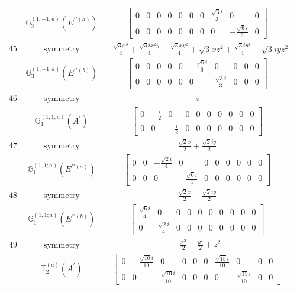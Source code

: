 \documentclass[fleqn,8pt,landscape]{jsarticle}
\begin{document}
\begin{longtable}{ccc}
$  $ & $ \mathbb{G}_{3}^{(1,-1;a)}(E^{\prime\prime(a)}) $ & $ \begin{bmatrix} 0 & 0 & 0 & 0 & 0 & 0 & 0 & \frac{\sqrt{3} i}{3} & 0 & 0 \\ 0 & 0 & 0 & 0 & 0 & 0 & 0 & 0 & - \frac{\sqrt{6} i}{6} & 0 \end{bmatrix} $ \\ \hline
$ 45 $ & $ \text{symmetry} $ & $ - \frac{\sqrt{3} x^{3}}{4} + \frac{\sqrt{3} i x^{2} y}{4} - \frac{\sqrt{3} x y^{2}}{4} + \sqrt{3} x z^{2} + \frac{\sqrt{3} i y^{3}}{4} - \sqrt{3} i y z^{2} $ \\
$  $ & $ \mathbb{G}_{3}^{(1,-1;a)}(E^{\prime\prime(b)}) $ & $ \begin{bmatrix} 0 & 0 & 0 & 0 & 0 & - \frac{\sqrt{6} i}{6} & 0 & 0 & 0 & 0 \\ 0 & 0 & 0 & 0 & 0 & 0 & \frac{\sqrt{3} i}{3} & 0 & 0 & 0 \end{bmatrix} $ \\ \hline
$ 46 $ & $ \text{symmetry} $ & $ z $ \\
$  $ & $ \mathbb{G}_{1}^{(1,1;a)}(A^{\prime}) $ & $ \begin{bmatrix} 0 & - \frac{i}{2} & 0 & 0 & 0 & 0 & 0 & 0 & 0 & 0 \\ 0 & 0 & - \frac{i}{2} & 0 & 0 & 0 & 0 & 0 & 0 & 0 \end{bmatrix} $ \\ \hline
$ 47 $ & $ \text{symmetry} $ & $ \frac{\sqrt{2} x}{2} + \frac{\sqrt{2} i y}{2} $ \\
$  $ & $ \mathbb{G}_{1}^{(1,1;a)}(E^{\prime\prime(a)}) $ & $ \begin{bmatrix} 0 & 0 & - \frac{\sqrt{2} i}{4} & 0 & 0 & 0 & 0 & 0 & 0 & 0 \\ 0 & 0 & 0 & - \frac{\sqrt{6} i}{4} & 0 & 0 & 0 & 0 & 0 & 0 \end{bmatrix} $ \\ \hline
$ 48 $ & $ \text{symmetry} $ & $ \frac{\sqrt{2} x}{2} - \frac{\sqrt{2} i y}{2} $ \\
$  $ & $ \mathbb{G}_{1}^{(1,1;a)}(E^{\prime\prime(b)}) $ & $ \begin{bmatrix} \frac{\sqrt{6} i}{4} & 0 & 0 & 0 & 0 & 0 & 0 & 0 & 0 & 0 \\ 0 & \frac{\sqrt{2} i}{4} & 0 & 0 & 0 & 0 & 0 & 0 & 0 & 0 \end{bmatrix} $ \\ \hline
$ 49 $ & $ \text{symmetry} $ & $ - \frac{x^{2}}{2} - \frac{y^{2}}{2} + z^{2} $ \\
$  $ & $ \mathbb{T}_{2}^{(a)}(A^{\prime}) $ & $ \begin{bmatrix} 0 & - \frac{\sqrt{10} i}{10} & 0 & 0 & 0 & 0 & \frac{\sqrt{15} i}{10} & 0 & 0 & 0 \\ 0 & 0 & \frac{\sqrt{10} i}{10} & 0 & 0 & 0 & 0 & \frac{\sqrt{15} i}{10} & 0 & 0 \end{bmatrix} $ \\ \hline

\end{longtable}
\end{document}
